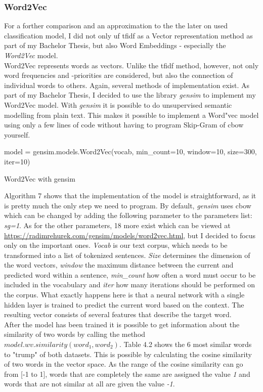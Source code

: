 \documentclass[a4paper, 11pt,titlepage,oneside,openany]{book}
\begin{document}
\subsubsection{Word2Vec} 
For a forther comparison and an approximation to the the later on used classification model, I did not only uf \gls{tfidf} as a Vector representation method as part of my Bachelor Thesis, but also Word Embeddings - especially the \textit{Word2Vec} model. \\
\noindent Word2Vec represents words as vectors. Unlike the  \gls{tfidf} method, however, not only word frequencies and -priorities are considered, but also the connection of individual words to others. Again, several methods of implementation exist. 
As part of my Bachelor Thesis, I decided to use  the library \textit{gensim} \cite{gensim} to implement my Word2Vec model. With \textit{gensim} it is  possible to do  unsupervised semantic modelling from plain text. This makes it possible to implement a Word"vec model using only a few lines of code without having to program Skip-Gram of \gls{cbow} yourself. \\
\begin{algorithm}[h]
	\DontPrintSemicolon
    model = gensim.models.Word2Vec(vocab, min\_count=10, window=10, size=300, iter=10)\;
	\caption{Word2Vec with gensim}
\end{algorithm}
\noindent Algorithm 7 shows that the implementation of the model is straightforward, as it is pretty much the only step we need to program. By default, \textit{gensim} uses \gls{cbow} which can be  changed  by adding the following parameter to the parameters list: \textit{sg=1}. As for the other parameters, 18 more exist which can be viewed at \url{https://radimrehurek.com/gensim/models/word2vec.html}, but I decided to focus only on the important ones. \textit{Vocab} is our text corpus, which needs to be transformed into a list of tokenized sentences. \textit{Size} determines the dimension of the word vectors, \textit{window} the maximum distance between the current and predicted word within a sentence, \textit{min\_count}  how often a word must occur to be included in the vocabulary and \textit{iter} how many iterations  should be performed on the corpus. What exactly happens here is that a neural network with a single hidden layer is trained to predict the current word based on the context. The resulting vector consists of several features that describe the target word.\\
\noindent 
After the model has been trained it is possible to get information about the similarity of two words by calling the method $model.wv.similarity(word_1, word_2)$. Table 4.2 shows the 6 most similar words to "trump" of both datasets. This is possible by calculating the cosine similarity of two words in the vector space. As the range of the cosine similarity can go from [-1 to 1], words that are completely the same are assigned the value \textit{1} and words that are not similar at all are given the value \textit{-1}. \\
\end{document}

